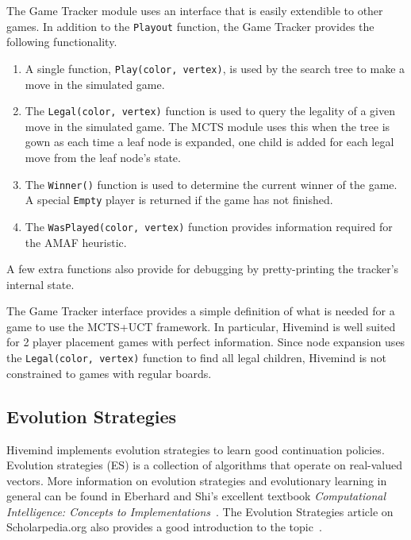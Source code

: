 \documentclass{acm_proc_article-sp}
\begin{document}
The Game Tracker module uses an interface that is easily extendible to other games. 
In addition to the \texttt{Playout} function, the Game Tracker provides the following functionality.
\begin{enumerate}
\item A single function, \texttt{Play(color, vertex)}, is used by the search tree to make a move in the simulated game.
\item The \texttt{Legal(color, vertex)} function is used to query the legality of a given move in the simulated game. 
The MCTS module uses this when the tree is gown as each time a leaf node is expanded,
one child is added for each legal move from the leaf node's state.
\item The \texttt{Winner()} function is used to determine the current winner of the game. 
	A special \texttt{Empty} player is returned if the game has not finished.
\item The \texttt{WasPlayed(color, vertex)} function provides information required for the AMAF heuristic.
\end{enumerate}
A few extra functions also provide for debugging by pretty-printing the tracker's internal state.

The Game Tracker interface provides a simple definition of what is needed for a game to use the MCTS+UCT framework. 
In particular, Hivemind is well suited for 2 player placement games with perfect information. 
Since node expansion uses the \texttt{Legal(color, vertex)} function to find all legal children,
Hivemind is not constrained to games with regular boards.

\subsection{Evolution Strategies}
\label{s:es}

Hivemind implements evolution strategies to learn good continuation policies.
Evolution strategies (ES) is a collection of algorithms that operate on real-valued vectors. 
More information on evolution strategies and evolutionary learning in general can be found in Eberhard and Shi's excellent textbook \emph{Computational Intelligence: Concepts to Implementations}~\cite{eberhart2007computational}. 
The Evolution Strategies article on Scholarpedia.org also provides a good introduction to the topic~\cite{Beyer:2007}.
\end{document}
